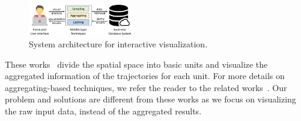 \begin{figure}
	\centering
	\includegraphics[width=0.40\textwidth]{pictures/framework/framework.pdf}
	\vspace{-2mm}
	\caption{System architecture for interactive visualization.} \label{fig:framework}
    \vspace{-2mm}
\end{figure}


These works~\cite{wood2010visualisation,guo2009flow,von2015mobilitygraphs} divide the {spatial space} into basic units and visualize the aggregated information of the trajectories for each unit. For more details on aggregating-based techniques, we refer the reader to the related works~\cite{andrienko2008spatio,adrienko2010spatial}. Our problem and solutions are different from these works as we focus on visualizing the raw input data, instead of the aggregated results.

